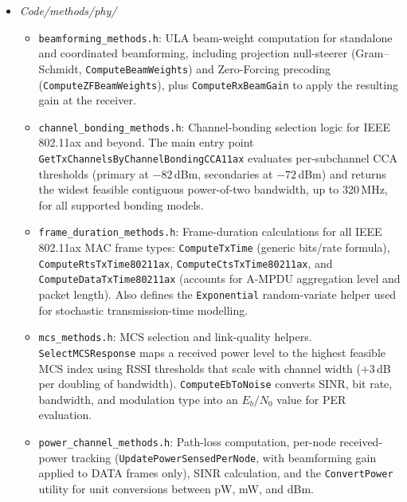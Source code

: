 \documentclass[11pt,a4paper]{article}
\begin{document}
\begin{itemize}
\begin{itemize}
        \item \texttt{node\_backoff\_methods.h}: DIFS/EIFS handling, EndBackoff dispatch.
        \item \texttt{node\_fsm\_methods.h}: Setup, Start, Stop, InitializeVariables, RestartNode.
        \item \texttt{node\_packet\_methods.h}: PrepareNewTransmission, GenerateNotification, MyTxFinished.
        \item \texttt{node\_timeout\_methods.h}: ACK/CTS/DATA/NPCA timeout handlers.
    \end{itemize}
    \item \textit{Code/methods/phy/}
    \begin{itemize}
        \item \texttt{beamforming\_methods.h}: ULA beam-weight computation for standalone and coordinated beamforming, including projection null-steerer (Gram--Schmidt, \texttt{ComputeBeamWeights}) and Zero-Forcing precoding (\texttt{ComputeZFBeamWeights}), plus \texttt{ComputeRxBeamGain} to apply the resulting gain at the receiver.
        \item \texttt{channel\_bonding\_methods.h}: Channel-bonding selection logic for IEEE 802.11ax and beyond. The main entry point \texttt{GetTxChannelsByChannelBondingCCA11ax} evaluates per-subchannel CCA thresholds (primary at $-82$\,dBm, secondaries at $-72$\,dBm) and returns the widest feasible contiguous power-of-two bandwidth, up to 320\,MHz, for all supported bonding models.
        \item \texttt{frame\_duration\_methods.h}: Frame-duration calculations for all IEEE 802.11ax MAC frame types: \texttt{ComputeTxTime} (generic bits/rate formula), \texttt{ComputeRtsTxTime80211ax}, \texttt{ComputeCtsTxTime80211ax}, and \texttt{ComputeDataTxTime80211ax} (accounts for A-MPDU aggregation level and packet length). Also defines the \texttt{Exponential} random-variate helper used for stochastic transmission-time modelling.
        \item \texttt{mcs\_methods.h}: MCS selection and link-quality helpers. \texttt{SelectMCSResponse} maps a received power level to the highest feasible MCS index using RSSI thresholds that scale with channel width ($+3$\,dB per doubling of bandwidth). \texttt{ComputeEbToNoise} converts SINR, bit rate, bandwidth, and modulation type into an $E_b/N_0$ value for PER evaluation.
        \item \texttt{power\_channel\_methods.h}: Path-loss computation, per-node received-power tracking (\texttt{UpdatePowerSensedPerNode}, with beamforming gain applied to DATA frames only), SINR calculation, and the \texttt{ConvertPower} utility for unit conversions between pW, mW, and dBm.

\end{itemize}
\end{itemize}
\end{document}
